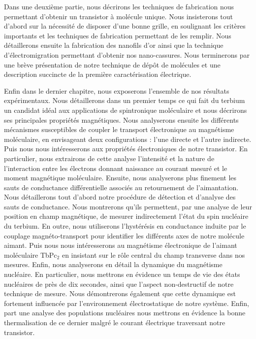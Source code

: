 Dans une deuxième partie, nous décrirons les techniques de fabrication nous permettant d'obtenir un transistor à molécule unique. Nous insisterons tout d'abord sur la nécessité de disposer d'une bonne grille, en soulignant les critères importants et les techniques de fabrication permettant de les remplir. Nous détaillerons ensuite la fabrication des nanofils d'or ainsi que la technique d'électromigration permettant d'obtenir nos nano-cassures. Nous terminerons par une brève présentation de notre technique de dépôt de molécules et une description succincte de la première caractérisation électrique.

Enfin dans le dernier chapitre, nous exposerons l'ensemble de nos résultats expérimentaux. Nous détaillerons dans un premier temps ce qui fait du terbium un candidat idéal aux applications de spintronique moléculaire et nous décrirons ses principales propriétés magnétiques. Nous analyserons ensuite les différents mécanismes susceptibles de coupler le transport électronique au magnétisme moléculaire, en envisageant deux configurations : l'une directe et l'autre indirecte. Puis nous nous intéresserons aux propriétés électroniques de notre transistor. En particulier, nous extrairons de cette analyse l'intensité et la nature de l'interaction entre les électrons donnant naissance au courant mesuré et le moment magnétique moléculaire. Ensuite, nous analyserons plus finement les sauts de conductance différentielle associés au retournement de l'aimantation. Nous détaillerons tout d'abord notre procédure de détection et d'analyse des sauts de conductance. Nous montrerons qu'ils permettent, par une analyse de leur position en champ magnétique, de mesurer indirectement l’état du spin nucléaire du terbium. En outre, nous utiliserons l'hystérésis en conductance induite par le couplage magnéto-transport pour identifier les différents axes de notre molécule aimant. Puis nous nous intéresserons au magnétisme électronique de l'aimant moléculaire TbPc$_{2}$ en insistant sur le rôle central du champ transverse dans nos mesures. Enfin, nous analyserons en détail la dynamique du magnétisme nucléaire. En particulier, nous mettrons en évidence un temps de vie des états nucléaires de près de dix secondes, ainsi que l'aspect non-destructif de notre technique de mesure. Nous démontrerons également que cette dynamique est fortement influencée par l'environnement électrostatique de notre système. Enfin, part une analyse des populations nucléaires nous mettrons en évidence la bonne thermalisation de ce dernier malgré le courant électrique traversant notre transistor.